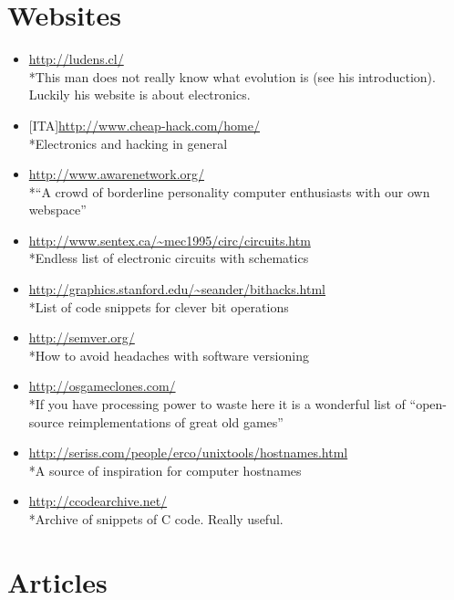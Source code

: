\documentclass{article}
\begin{document}
\section{Websites}
\begin{itemize}
	\item \url{http://ludens.cl/}
	\\*This man does not really know what evolution is (see his introduction). Luckily his website is about electronics. 
     \item {[}ITA{]}\url{http://www.cheap-hack.com/home/}
     \\*Electronics and hacking in general
     \item \url{http://www.awarenetwork.org/}
     \\*``A crowd of borderline personality computer enthusiasts with our own webspace''
     \item \url{http://www.sentex.ca/~mec1995/circ/circuits.htm}
     \\*Endless list of electronic circuits with schematics 
     \item \url{http://graphics.stanford.edu/~seander/bithacks.html}
     \\*List of code snippets for clever bit operations 
     \item \url{http://semver.org/}
     \\*How to avoid headaches with software versioning 
     \item \url{http://osgameclones.com/}
     \\*If you have processing power to waste here it is a wonderful list of ``open-source reimplementations of great old games''
     \item \url{http://seriss.com/people/erco/unixtools/hostnames.html}
     \\*A source of inspiration for computer hostnames
     \item \url{http://ccodearchive.net/}
     \\*Archive of snippets of C code. Really useful.
\end{itemize}
%
%
\section{Articles}
\end{document}
